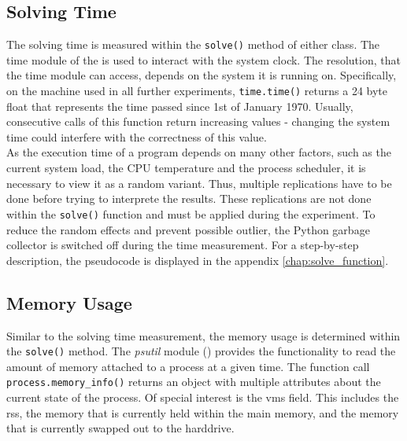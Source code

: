 \documentclass[./\jobname.tex]{subfiles}
\begin{document}
\subsection{Solving Time}
\label{chap:metric_time}
The solving time is measured within the \colorbox{light-gray}{\lstinline[basicstyle=\ttfamily\color{black}]|solve()|} method of either class. The time module of the \cite{python_standard_library_time_2020} is used to interact with the system clock. The resolution, that the time module can access, depends on the system it is running on. Specifically, on the machine used in all further experiments, \colorbox{light-gray}{\lstinline[basicstyle=\ttfamily\color{black}]|time.time()|} returns a 24 byte float that represents the time passed since 1st of January 1970. Usually, consecutive calls of this function return increasing values - changing the system time could interfere with the correctness of this value.\\ 

As the execution time of a program depends on many other factors, such as the current system load, the CPU temperature and the process scheduler, it is necessary to view it as a random variant. Thus, multiple replications have to be done before trying to interprete the results. These replications are not done within the \colorbox{light-gray}{\lstinline[basicstyle=\ttfamily\color{black}]|solve()|} function and must be applied during the experiment. To reduce the random effects and prevent possible outlier, the Python garbage collector is switched off during the time measurement. For a step-by-step description, the pseudocode is displayed in the appendix \ref{chap:solve_function}. 

\subsection{Memory Usage}
\label{chap:metric_mem}
Similar to the solving time measurement, the memory usage is determined within the \colorbox{light-gray}{\lstinline[basicstyle=\ttfamily\color{black}]|solve()|} method. The \textit{psutil} module (\cite{rodola_psutil_2020}) provides the functionality to read the amount of memory attached to a process at a given time. The function call \colorbox{light-gray}{\lstinline[basicstyle=\ttfamily\color{black}]|process.memory_info()|} returns an object with multiple attributes about the current state of the process. Of special interest is the \gls{vms} field. This includes the \gls{rss}, the memory that is currently held within the main memory, and the memory that is currently swapped out to the harddrive.
\end{document}
